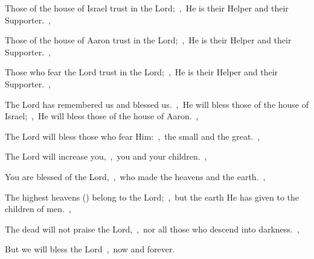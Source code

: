 \documentclass[12pt,twoside,a5paper]{article}
\begin{document}
\begin{normalparskip}
  Those of the house of Israel trust in the Lord;~\sep\ He is their Helper and their Supporter.~\sep

  Those of the house of Aaron trust in the Lord;~\sep\ He is their Helper and their Supporter.~\sep

  Those who fear the Lord trust in the Lord;~\sep\ He is their Helper and their Supporter.~\sep

  The Lord has remembered us and blessed us.~\sep\ He will bless those of the house of Israel;~\sep\ He will bless those of the house of Aaron.~\sep

  The Lord will bless those who fear Him:~\sep\ the small and the great.~\sep

  The Lord will increase you,~\sep\ you and your children.~\sep

  You are blessed of the Lord,~\sep\ who made the heavens and the earth.~\sep

  The highest heavens () belong to the Lord;~\sep\ but the earth He has given to the children of men.~\sep

  The dead will not praise the Lord,~\sep\ nor all those who descend into darkness.~\sep

  But we will bless the Lord~\sep\ now and forever.
\end{normalparskip}



\end{document}
